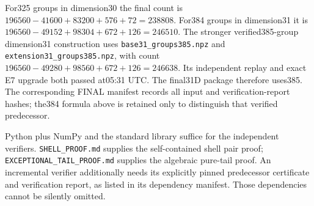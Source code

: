 For325 groups in dimension30 the final count is
$196560-41600+83200+576+72=238808$.
For384 groups in dimension31 it is
$196560-49152+98304+672+126=246510$.
The stronger verified385-group dimension31 construction uses
\texttt{base31\_groups385.npz} and \texttt{extension31\_groups385.npz},
with count $196560-49280+98560+672+126=246638$.
Its independent replay and exact E7 upgrade both passed at05:31 UTC.
The final31D package therefore uses385. The corresponding FINAL manifest
records all input and verification-report hashes; the384 formula above
is retained only to distinguish that verified predecessor.

Python plus NumPy and the standard library suffice for the independent
verifiers. \texttt{SHELL\_PROOF.md} supplies the self-contained shell
pair proof; \texttt{EXCEPTIONAL\_TAIL\_PROOF.md} supplies the algebraic
pure-tail proof. An incremental verifier additionally needs its explicitly
pinned predecessor certificate and verification report, as listed in its
dependency manifest. Those dependencies cannot be silently omitted.

